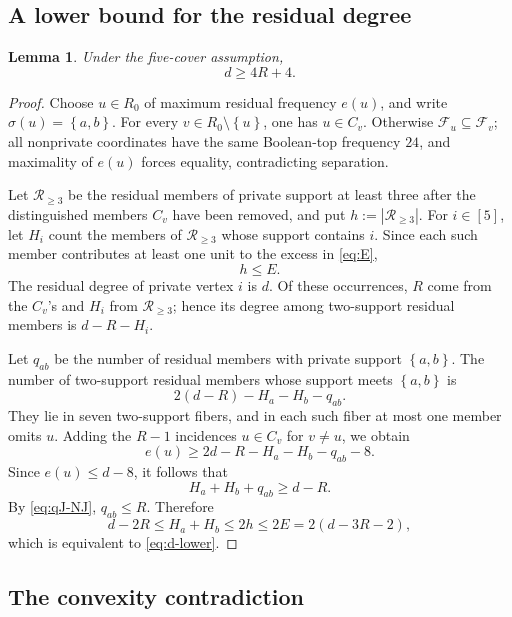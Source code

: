 \documentclass[11pt,reqno]{amsart}
\numberwithin{equation}{section}
\newtheorem{lemma}[lemma]{Lemma}
\theoremstyle{definition}
\theoremstyle{remark}
\newcommand{\F}{\mathcal{F}}
\newcommand{\1}{\mathbf{1}}
\newcommand{\set}[1]{\left\{#1\right\}}
\newcommand{\abs}[1]{\left|#1\right|}
\begin{document}
\subsection{A lower bound for the residual degree}

\begin{lemma}\label{lem:d-lower}
Under the five-cover assumption,
\begin{equation}\label{eq:d-lower}
d\ge4R+4.
\end{equation}
\end{lemma}

\begin{proof}
Choose \(u\in R_0\) of maximum residual frequency \(e(u)\), and write \(\sigma(u)=\set{a,b}\).  For every \(v\in R_0\setminus\set{u}\), one has \(u\in C_v\).  Otherwise \(\F_u\subseteq\F_v\); all nonprivate coordinates have the same Boolean-top frequency \(24\), and maximality of \(e(u)\) forces equality, contradicting separation.

Let \(\mathcal R_{\ge3}\) be the residual members of private support at least three after the distinguished members \(C_v\) have been removed, and put \(h:=\abs{\mathcal R_{\ge3}}\).  For \(i\in[5]\), let \(H_i\) count the members of \(\mathcal R_{\ge3}\) whose support contains \(i\).  Since each such member contributes at least one unit to the excess in \cref{eq:E},
\begin{equation}\label{eq:h-E}
h\le E.
\end{equation}
The residual degree of private vertex \(i\) is \(d\).  Of these occurrences, \(R\) come from the \(C_v\)'s and \(H_i\) from \(\mathcal R_{\ge3}\); hence its degree among two-support residual members is \(d-R-H_i\).

Let \(q_{ab}\) be the number of residual members with private support \(\set{a,b}\).  The number of two-support residual members whose support meets \(\set{a,b}\) is
\[
2(d-R)-H_a-H_b-q_{ab}.
\]
They lie in seven two-support fibers, and in each such fiber at most one member omits \(u\).  Adding the \(R-1\) incidences \(u\in C_v\) for \(v\ne u\), we obtain
\[
e(u)\ge2d-R-H_a-H_b-q_{ab}-8.
\]
Since \(e(u)\le d-8\), it follows that
\begin{equation}\label{eq:Hqab}
H_a+H_b+q_{ab}\ge d-R.
\end{equation}
By \cref{eq:qJ-NJ}, \(q_{ab}\le R\).  Therefore
\[
d-2R
\le H_a+H_b
\le2h
\le2E
=2(d-3R-2),
\]
which is equivalent to \cref{eq:d-lower}.
\end{proof}

\subsection{The convexity contradiction}
\end{document}
